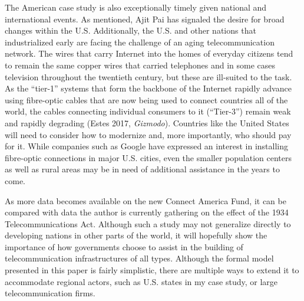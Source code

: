 \documentclass[12pt]{article}
\begin{document}
	The American case study is also exceptionally timely given national and international events. As mentioned, Ajit Pai has signaled the desire for broad changes within the U.S. Additionally, the U.S. and other nations that industrialized early are facing the challenge of an aging telecommunication network. The wires that carry Internet into the homes of everyday citizens tend to remain the same copper wires that carried telephones and in some cases television throughout the twentieth century, but these are ill-suited to the task. As the ``tier-1'' systems that form the backbone of the Internet rapidly advance using fibre-optic cables that are now being used to connect countries all of the world, the cables connecting individual consumers to it (``Tier-3'') remain weak and rapidly degrading (Estes 2017, \textit{Gizmodo}). Countries like the United States will need to consider how to modernize and, more importantly, who should pay for it. While companies such as Google have expressed an interest in installing fibre-optic connections in major U.S. cities, even the smaller population centers as well as rural areas may be in need of additional assistance in the years to come.
	
	As more data becomes available on the new Connect America Fund, it can be compared with data the author is currently gathering on the effect of the 1934 Telecommunications Act. Although such a study may not generalize directly to developing nations in other parts of the world, it will hopefully show the importance of how governments choose to assist in the building of telecommunication infrastructures of all types. Although the formal model presented in this paper is fairly simplistic, there are multiple ways to extend it to accommodate regional actors, such as U.S. states in my case study, or large telecommunication firms.
	
	\pagebreak
	
\end{document}
